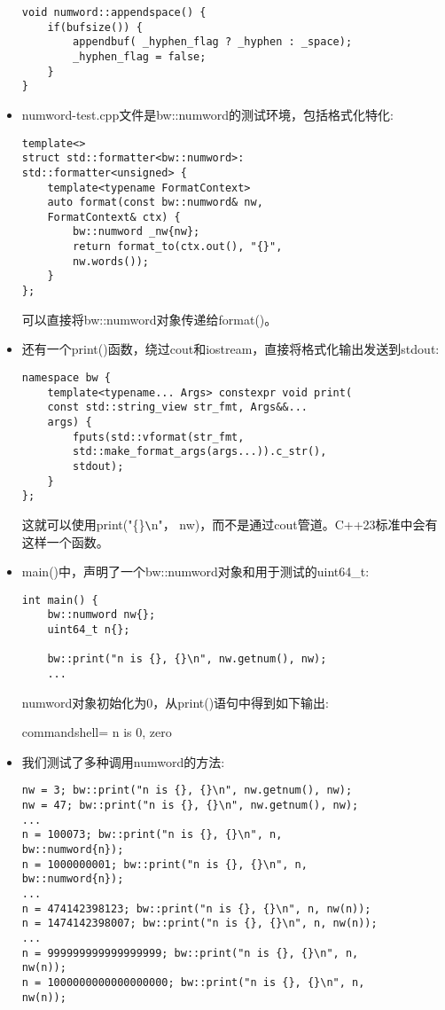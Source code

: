 \begin{itemize}
\begin{lstlisting}[style=styleCXX]
void numword::appendspace() {
	if(bufsize()) {
		appendbuf( _hyphen_flag ? _hyphen : _space);
		_hyphen_flag = false;
	}
}
\end{lstlisting}

\item 
numword-test.cpp文件是bw::numword的测试环境，包括格式化特化:

\begin{lstlisting}[style=styleCXX]
template<>
struct std::formatter<bw::numword>:
std::formatter<unsigned> {
	template<typename FormatContext>
	auto format(const bw::numword& nw,
	FormatContext& ctx) {
		bw::numword _nw{nw};
		return format_to(ctx.out(), "{}",
		nw.words());
	}
};
\end{lstlisting}

可以直接将bw::numword对象传递给format()。

\item 
还有一个print()函数，绕过cout和iostream，直接将格式化输出发送到stdout:

\begin{lstlisting}[style=styleCXX]
namespace bw {
	template<typename... Args> constexpr void print(
	const std::string_view str_fmt, Args&&...
	args) {
		fputs(std::vformat(str_fmt,
		std::make_format_args(args...)).c_str(),
		stdout);
	}
};
\end{lstlisting}

这就可以使用print("\{\}\verb|\|n"， nw)，而不是通过cout管道。C++23标准中会有这样一个函数。

\item 
main()中，声明了一个bw::numword对象和用于测试的uint64\_t:

\begin{lstlisting}[style=styleCXX]
int main() {
	bw::numword nw{};
	uint64_t n{};
	
	bw::print("n is {}, {}\n", nw.getnum(), nw);
	...
\end{lstlisting}

numword对象初始化为0，从print()语句中得到如下输出:

\begin{tcblisting}{commandshell={}}
n is 0, zero
\end{tcblisting}

\item 
我们测试了多种调用numword的方法:

\begin{lstlisting}[style=styleCXX]
nw = 3; bw::print("n is {}, {}\n", nw.getnum(), nw);
nw = 47; bw::print("n is {}, {}\n", nw.getnum(), nw);
...
n = 100073; bw::print("n is {}, {}\n", n,
bw::numword{n});
n = 1000000001; bw::print("n is {}, {}\n", n,
bw::numword{n});
...
n = 474142398123; bw::print("n is {}, {}\n", n, nw(n));
n = 1474142398007; bw::print("n is {}, {}\n", n, nw(n));
...
n = 999999999999999999; bw::print("n is {}, {}\n", n,
nw(n));
n = 1000000000000000000; bw::print("n is {}, {}\n", n,
nw(n));
\end{lstlisting}


\end{itemize}
